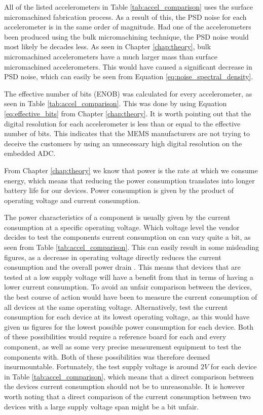 All of the listed accelerometers in Table \ref{tab:accel_comparison} uses the surface micromachined fabrication process. As a result of this, the PSD noise for each accelerometer is in the same order of magnitude. Had one of the accelerometers been produced using the bulk micromachining technique, the PSD noise would most likely be decades less. As seen in Chapter \ref{chap:theory}, bulk micromachined accelerometers have a much larger mass than surface micromachined accelerometers. This would have caused a significant decrease in PSD noise, which can easily be seen from Equation \ref{eq:noise_spectral_density}.

The effective number of bits (ENOB) was calculated for every accelerometer, as seen in Table \ref{tab:accel_comparison}. This was done by using Equation \ref{eq:effective_bits} from Chapter \ref{chap:theory}. It is worth pointing out that the digital resolution for each accelerometer is less than or equal to the effective number of bits. This indicates that the MEMS manufacturers are not trying to deceive the customers by using an unnecessary high digital resolution on the embedded ADC.

From Chapter \ref{chap:theory} we know that power is the rate at which we consume energy, which means that reducing the power consumption translates into longer battery life for our devices. Power consumption is given by the product of operating voltage and current consumption. 

The power characteristics of a component is usually given by the current consumption at a specific operating voltage. Which voltage level the vendor decides to test the components current consumption on can vary quite a bit, as seen from Table \ref{tab:accel_comparison}. This can easily result in some misleading figures, as a decrease in operating voltage directly reduces the current consumption and the overall power drain \cite[~p.3]{holberg06}. This means that devices that are tested at a low supply voltage will have a benefit from that in terms of having a lower current consumption. To avoid an unfair comparison between the devices, the best course of action would have been to measure the current consumption of all devices at the same operating voltage. Alternatively, test the current consumption for each device at its lowest operating voltage, as this would have given us figures for the lowest possible power consumption for each device. Both of these possibilities would require a reference board for each and every component, as well as some very precise measurement equipment to test the components with. Both of these possibilities was therefore deemed insurmountable. Fortunately, the test supply voltage is around $2V$ for each device in Table \ref{tab:accel_comparison}, which means that a direct comparison between the devices current consumption should not be to unreasonable. It is however worth noting that a direct comparison of the current consumption between two devices with a large supply voltage span might be a bit unfair.

